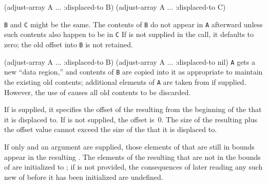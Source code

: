 \code
 (adjust-array A ... :displaced-to B)
 (adjust-array A ... :displaced-to C)
\endcode

{\tt B} and {\tt C} might be the same. The contents of {\tt B} do not appear in 
{\tt A} afterward unless such contents also happen to be in {\tt C}  If
is not supplied in the  call, it defaults
to zero; the old offset into {\tt B} is not retained.
                                  

\code
 (adjust-array A ... :displaced-to B)
 (adjust-array A ... :displaced-to nil)
\endcode
{\tt A} gets a
new ``data region,'' and contents of {\tt B} are copied into it as appropriate to
maintain the existing old contents; additional elements of {\tt A} 
are taken from
 if supplied.  However, 
the use of  causes all old contents
to be discarded.
\endlist
{}
                      
If  is supplied,
it specifies the offset
of the resulting  from the beginning of 
the  that it is displaced to.           
If  is not supplied, the offset is~0.  
The size of the resulting  plus the 
offset value cannot exceed the size of
the  that it is displaced to.

If only 
and an  argument are supplied,
those elements of  that
are still in bounds appear in the resulting . The elements of
the resulting  that are not in the bounds of 
 are initialized
to ; if  is not provided,
the consequences of later reading any such new  of 
before it has been initialized
are undefined.

